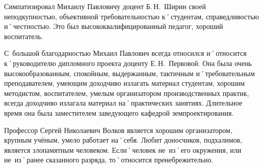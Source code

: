 Симпатизировал Михаилу Павловичу доцент Б.\,Н.~Ширин своей неподкупностью, объективной требовательностью к˚студентам, справедливостью и˚честностью. Это был высококвалифицированный педагог, хороший воспитатель.

С~большой благодарностью Михаил Павлович всегда относился и˚относится к˚руководителю дипломного проекта доценту Е.\,Н.~Первовой. Она была очень высокообразованным, спокойным, выдержанным, тактичным и˚требовательным преподавателем, умеющим доходчиво излагать материал студентам, хорошим методистом, воспитателем, умелым организатором производственных практик, всегда доходчиво излагала материал на˚практических занятиях. Длительное время она была заместителем заведующего кафедрой земпроектирования.

Профессор Сергей Николаевич Волков является хорошим организатором, крупным учёным, умело работает на˚себя. Любит доносчиков, подхалимов, является злопамятным человеком. Если˚человек не~из˚его окружения, или не~из˚ранее сказанного разряда, то˚относится пренебрежительно. 
